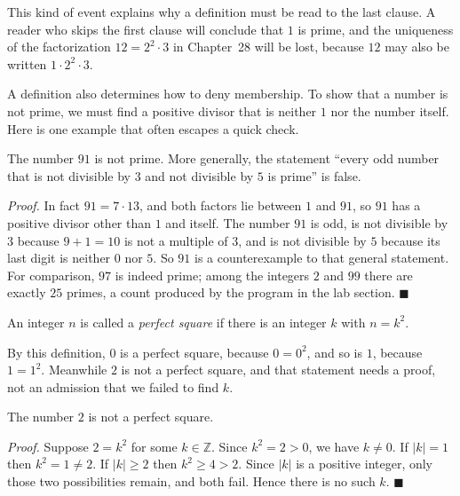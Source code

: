 This kind of event explains why a definition must be read to the last clause.
A reader who skips the first clause will conclude that $1$ is prime, and
the uniqueness of the factorization $12 = 2^{2}\cdot 3$ in Chapter~28 will be lost, because $12$ may
also be written $1 \cdot 2^{2} \cdot 3$.

A definition also determines how to deny membership. To show that a
number is not prime, we must find a positive divisor that is neither $1$ nor
the number itself. Here is one example that often escapes a quick check.

\begin{proposisi}
The number $91$ is not prime. More generally, the statement ``every odd number
that is not divisible by $3$ and not divisible by $5$ is prime'' is false.
\end{proposisi}
\par\smallskip\noindent\textit{Proof.} In fact $91 = 7 \cdot 13$, and both factors
lie between $1$ and $91$, so $91$ has a positive divisor other than $1$ and
itself. The number $91$ is odd, is not divisible by $3$ because $9+1 = 10$ is not a multiple
of $3$, and is not divisible by $5$ because its last digit is neither $0$ nor $5$. So $91$
is a counterexample to that general statement. For comparison, $97$ is indeed prime; among the integers $2$ and $99$ there are
exactly $25$ primes, a count produced by the program in the lab section.
\hfill$\blacksquare${\parfillskip=0pt\par}

\begin{definisi}
An integer $n$ is called a \emph{perfect square} if there is an integer $k$
with $n = k^{2}$.
\end{definisi}

By this definition, $0$ is a perfect square, because $0 = 0^{2}$, and so is $1$,
because $1 = 1^{2}$. Meanwhile $2$ is not a perfect square, and that statement needs
a proof, not an admission that we failed to find $k$.

\begin{proposisi}
The number $2$ is not a perfect square.
\end{proposisi}
\par\smallskip\noindent\textit{Proof.} Suppose $2 = k^{2}$ for some $k \in
\mathbb{Z}$. Since $k^{2} = 2 > 0$, we have $k \neq 0$. If $|k| = 1$ then
$k^{2} = 1 \neq 2$. If $|k| \geq 2$ then $k^{2} \geq 4 > 2$. Since $|k|$ is a
positive integer, only those two possibilities remain, and both fail. Hence there is no
such $k$.
\hfill$\blacksquare${\parfillskip=0pt\par}

